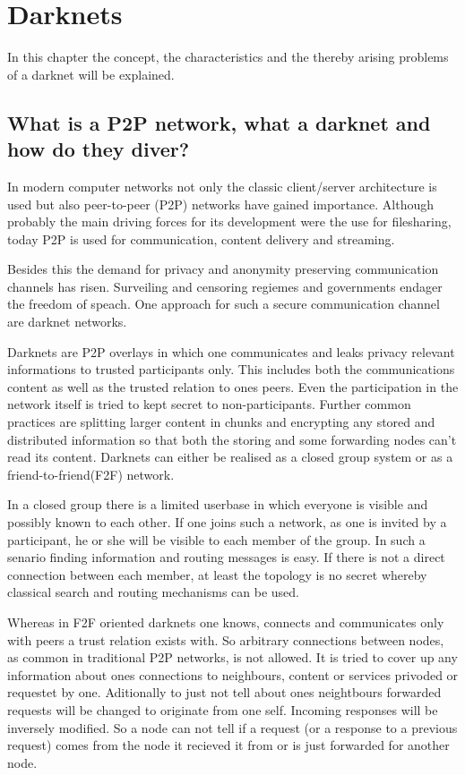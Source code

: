 \chapter{Darknets}

In this chapter the concept, the characteristics and the thereby arising problems of a darknet will be explained. 

\section{What is a P2P network, what a darknet and how do they diver?}

In modern computer networks not only the classic client/server architecture is used but also peer-to-peer (P2P) networks have gained importance. Although probably the main driving forces for its development were the use for filesharing, today P2P is used for communication, content delivery and streaming.

Besides this the demand for privacy and anonymity preserving communication channels has risen. Surveiling and censoring regiemes and governments endager the freedom of speach. One approach for such a secure communication channel are darknet networks.

Darknets are P2P overlays in which one communicates and leaks privacy relevant informations to trusted participants only. This includes both the communications content as well as the trusted relation to ones peers. Even the participation in the network itself is tried to kept secret to non-participants. Further common practices are splitting larger content in chunks and encrypting any stored and distributed information so that both the storing and some forwarding nodes can't read its content. Darknets can either be realised as a closed group system or as a friend-to-friend(F2F) network.

In a closed group there is a limited userbase in which everyone is visible and possibly known to each other. If one joins such a network, as one is invited by a participant, he or she will be visible to each member of the group. In such a senario finding information and routing messages is easy. If there is not a direct connection between each member, at least the topology is no secret whereby classical search and routing mechanisms can be used.

Whereas in F2F oriented darknets one knows, connects and communicates only with peers a trust relation exists with. So arbitrary connections between nodes, as common in traditional P2P networks, is not allowed. It is tried to cover up any information about ones connections to neighbours, content or services privoded or requestet by one. Aditionally to just not tell about ones neightbours forwarded requests will be changed to originate from one self. Incoming responses will be inversely modified. So a node can not tell if a request (or a response to a previous request) comes from the node it recieved it from or is just forwarded for another node.

